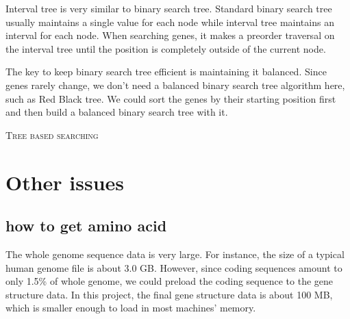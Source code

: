 \documentclass[onehalf,11pt]{beavtex}
\begin{document}
Interval tree is very similar to binary search tree. Standard binary search tree usually maintains a single value for each node while interval tree maintains an interval for each node. When searching genes, it makes a preorder traversal on the interval tree until the position is completely outside of the current node.

The key to keep binary search tree efficient is maintaining it balanced. Since genes rarely change, we don't need a balanced binary search tree algorithm here, such as Red Black tree. We could sort the genes by their starting position first and then build a balanced binary search tree with it.
\IncMargin{1em}
\begin{algorithm}

 \label{alg:alg_tree}
 \SetAlgoLined
\BlankLine	


\BlankLine


 \caption{\textsc{Tree based searching}}
\end{algorithm}\DecMargin{1em} 

\section{Other issues}

\subsection{how to get amino acid}
The whole genome sequence data is very large. For instance, the size of a typical human genome file is about 3.0 GB. However, since coding sequences amount to only 1.5\% of whole genome, we could preload the coding sequence to the gene structure data. In this project, the final gene structure data is about 100 MB, which is smaller enough to load in most machines' memory.
\end{document}
